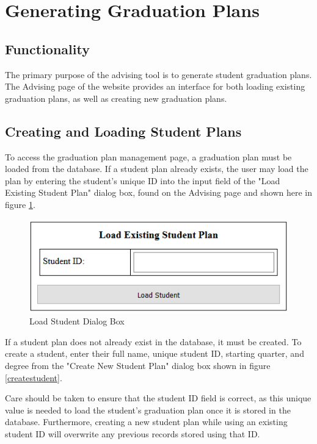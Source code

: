 \documentclass[]{article}
\begin{document}
\pagebreak\section{Generating Graduation Plans}
	\subsection{Functionality}\label{ssec:6}
	
		The primary purpose of the advising tool is to generate student graduation plans. The Advising page of the website provides an interface for both loading existing graduation plans, as well as creating new graduation plans. 
	\subsection{Creating and Loading Student Plans}\label{ssec:7}
	
		To access the graduation plan management page, a graduation plan must be loaded from the database. If a student plan already exists, the user may load the plan by entering the student's unique ID into the input field of the "Load Existing Student Plan" dialog box, found on the Advising page and shown here in figure \ref{loadstudent}. \\
		\begin{figure}[H]
			\caption{Load Student Dialog Box}
			\label{loadstudent}
			\centering
			\includegraphics{loadstudent.PNG}
		\end{figure}
	
		If a student plan does not already exist in the database, it must be created. To create a student, enter their full name, unique student ID, starting quarter, and degree from the "Create New Student Plan" dialog box shown in figure \ref{createstudent}.

		Care should be taken to ensure that the student ID field is correct, as this unique value is needed to load the student's graduation plan once it is stored in the database. Furthermore, creating a new student plan while using an existing student ID will overwrite any previous records stored using that ID. \\~\\
	
\end{document}
